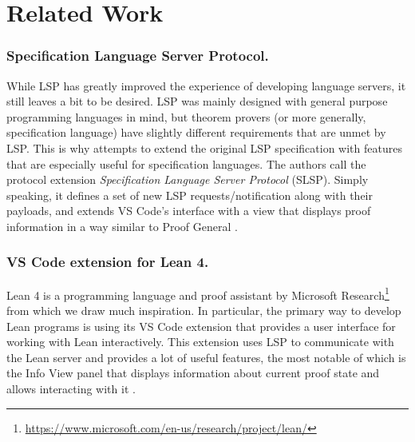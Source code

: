 \section{Related Work}


\subsubsection{Specification Language Server Protocol.}

While LSP has greatly improved the experience of developing language servers,
it still leaves a bit to be desired.
LSP was mainly designed with general purpose programming languages in mind,
but theorem provers (or more generally, specification language) have slightly
different requirements that are unmet by LSP.
This is why \cite{JonasKjaerRask2021} attempts to extend the original LSP
specification with features that are especially useful for specification languages.
The authors call the protocol extension \textit{Specification Language Server Protocol} (SLSP).
Simply speaking, it defines a set of new LSP requests/notification along with
their payloads, and extends VS Code's interface with a view that displays proof
information in a way similar to Proof General \cite{Aspinall2000}.

\subsubsection{VS Code extension for Lean 4.}

Lean 4 \cite{deMouraUllrich2021} is a programming language and proof assistant
by Microsoft Research\footnote{\url{https://www.microsoft.com/en-us/research/project/lean/}}
from which we draw much inspiration.
In particular, the primary way to develop Lean programs is using its VS Code
extension that provides a user interface for working with Lean interactively.
This extension uses LSP to communicate with the Lean server and provides a lot
of useful features, the most notable of which is the Info View panel that
displays information about current proof state and allows interacting with it \cite{Nawrocki2023}.

